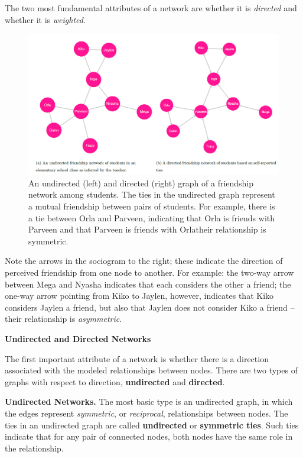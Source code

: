 \documentclass{book}
\begin{document}
The two most fundamental attributes of a network are whether it is
\emph{directed} and whether it is \emph{weighted}.

\begin{figure}
\centering
\includegraphics{images/social-networks/11-2.png}
\caption{An undirected (left) and directed (right) graph of a friendship
network among students. The ties in the undirected graph represent a mutual
friendship between pairs of students. For example, there is a tie between Orla
and Parveen, indicating that Orla is friends with Parveen and that Parveen is
friends with Orla\textbar their relationship is symmetric.}
\end{figure}

Note the arrows in the sociogram to the right; these indicate the direction of
perceived friendship from one node to another. For example: the two-way arrow
between Mega and Nyasha indicates that each considers the other a friend; the
one-way arrow pointing from Kiko to Jaylen, however, indicates that Kiko
considers Jaylen a friend, but also that Jaylen does not consider Kiko a
friend --their relationship is \emph{asymmetric}.

\textbf{Undirected and Directed Networks}

The first important attribute of a network is whether there is a direction
associated with the modeled relationships between nodes. There are two types
of graphs with respect to direction, \textbf{undirected} and
\textbf{directed}.

\textbf{Undirected Networks.} The most basic type is an undirected graph, in
which the edges represent \emph{symmetric}, or \emph{reciprocal},
relationships between nodes. The ties in an undirected graph are called
\textbf{undirected} or \textbf{symmetric ties}. Such ties indicate that for
any pair of connected nodes, both nodes have the same role in the
relationship.
\end{document}

